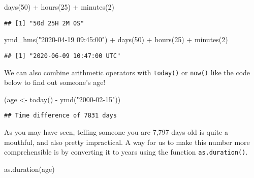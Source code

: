\documentclass[
]{book}
\newenvironment{Shaded}{\begin{snugshade}}{\end{snugshade}}
\newcommand{\DecValTok}[1]{\textcolor[rgb]{0.00,0.00,0.81}{#1}}
\newcommand{\FunctionTok}[1]{\textcolor[rgb]{0.00,0.00,0.00}{#1}}
\newcommand{\NormalTok}[1]{#1}
\newcommand{\OtherTok}[1]{\textcolor[rgb]{0.56,0.35,0.01}{#1}}
\newcommand{\SpecialCharTok}[1]{\textcolor[rgb]{0.00,0.00,0.00}{#1}}
\newcommand{\StringTok}[1]{\textcolor[rgb]{0.31,0.60,0.02}{#1}}
\begin{document}
\begin{Shaded}
\begin{Highlighting}[]
\FunctionTok{days}\NormalTok{(}\DecValTok{50}\NormalTok{) }\SpecialCharTok{+} \FunctionTok{hours}\NormalTok{(}\DecValTok{25}\NormalTok{) }\SpecialCharTok{+} \FunctionTok{minutes}\NormalTok{(}\DecValTok{2}\NormalTok{)}
\end{Highlighting}
\end{Shaded}

\begin{verbatim}
## [1] "50d 25H 2M 0S"
\end{verbatim}

\begin{Shaded}
\begin{Highlighting}[]
\FunctionTok{ymd\_hms}\NormalTok{(}\StringTok{"2020{-}04{-}19 09:45:00"}\NormalTok{) }\SpecialCharTok{+}
    \FunctionTok{days}\NormalTok{(}\DecValTok{50}\NormalTok{) }\SpecialCharTok{+} \FunctionTok{hours}\NormalTok{(}\DecValTok{25}\NormalTok{) }\SpecialCharTok{+} \FunctionTok{minutes}\NormalTok{(}\DecValTok{2}\NormalTok{)}
\end{Highlighting}
\end{Shaded}

\begin{verbatim}
## [1] "2020-06-09 10:47:00 UTC"
\end{verbatim}

We can also combine arithmetic operators with \texttt{today()} or \texttt{now()} like the code below to find out someone's age!

\begin{Shaded}
\begin{Highlighting}[]
\NormalTok{(age }\OtherTok{\textless{}{-}} \FunctionTok{today}\NormalTok{() }\SpecialCharTok{{-}} \FunctionTok{ymd}\NormalTok{(}\StringTok{"2000{-}02{-}15"}\NormalTok{))}
\end{Highlighting}
\end{Shaded}

\begin{verbatim}
## Time difference of 7831 days
\end{verbatim}

As you may have seen, telling someone you are 7,797 days old is quite a mouthful, and also pretty impractical. A way for us to make this number more comprehensible is by converting it to years using the function \texttt{as.duration()}.

\begin{Shaded}
\begin{Highlighting}[]
\FunctionTok{as.duration}\NormalTok{(age)}
\end{Highlighting}
\end{Shaded}
\end{document}
